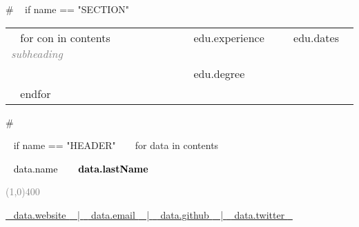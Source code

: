 

\medskip

\selectfont


\begin{minipage}{\textwidth}

{# 
~{ if name == "SECTION" }~

\begin{tabular}{ p{} %
                   p{} 
                   p{}} %
  ~{ for con in contents }~
  \small\textcolor{gray}{{\emph{ subheading }}} & {~{{ edu.experience }}~} & {\hfill \small{~{{ edu.dates }}~}}\\
  \small & {~{{ edu.degree }}~} & {\hfill} \newline\\
  ~{ endfor }~
\end{tabular}
#}



~{ if name == "HEADER" }~
  ~{ for data in contents }~

    \begin{center} %
    \HUGE\textcolor{black}{~{{ data.name }}~}
    \HUGE\textcolor{black}{\textbf{~{{ data.lastName }}~}}
    \end{center}

    \begin{center}
    \textcolor{gray}{\line(1,0){400}}
    \end{center}

    \begin{center}
    \footnotesize 
    \href{~{{ data.websiteURL }}~}{\faHome \hspace{0.05cm} ~{{ data.website }}~ | \hspace{0.1cm}}
    \href{mailto: ~{{ data.email }}~ }{\faEnvelope \hspace{0.05cm} ~{{ data.email }}~ | \hspace{0.1cm}} 
    \href{~{{ data.githubURL }}~}{\faGithub \hspace{0.05cm} ~{{ data.github }}~ | \hspace{0.1cm}}
    \href{~{{ data.twitterURL }}~}{\faTwitter \hspace{0.05cm} ~{{ data.twitter }}~ }  
    \end{center}


\end{minipage}
